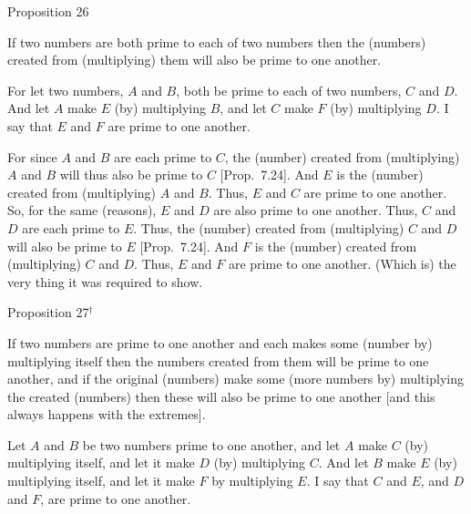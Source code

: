 
\begin{center}
{\large Proposition 26}
\end{center}

If two numbers are both prime to each of two
numbers then the (numbers) created from (multiplying) them will
also be prime to one another.

\epsfysize=1in
\centerline{}

For let two numbers, $A$ and $B$, both be prime to each of two numbers, $C$ and
$D$. And let $A$ make $E$ (by) multiplying $B$, and let $C$ make $F$ (by) multiplying
$D$. I say that $E$ and $F$ are prime to one another.

For since $A$ and $B$ are each prime to $C$, the (number) created from (multiplying) $A$ and $B$ will thus also be prime to $C$ [Prop.~7.24]. And $E$ is the (number) created
from (multiplying) $A$ and $B$. Thus, $E$ and $C$ are prime to one another.
So, for the same (reasons), $E$ and $D$ are also prime to one another.
Thus, $C$ and $D$ are each prime to $E$. Thus, the (number) created from
(multiplying) $C$ and $D$ will also be prime to $E$ [Prop.~7.24]. And $F$ is the (number) created from
(multiplying) $C$ and $D$. Thus, $E$ and $F$ are prime to one another.
(Which is) the very thing it was required to show.


\begin{center}
{\large Proposition 27}$^\dag$
\end{center}

If two numbers are prime to one another and each
makes some (number by) multiplying itself then the numbers
created from them will be prime to one another, and if the original (numbers)
make some (more numbers by) multiplying the created (numbers) then these 
will also be prime to one another [and this always happens with the
extremes].

\epsfysize=2in
\centerline{}

Let $A$ and $B$ be two numbers prime to one another, and let $A$ make
$C$ (by) multiplying itself, and let it make $D$ (by) multiplying $C$. 
And let $B$ make $E$ (by) multiplying itself, and let it make $F$ by multiplying $E$.
I say that $C$ and $E$, and $D$ and $F$, are prime to one another.

